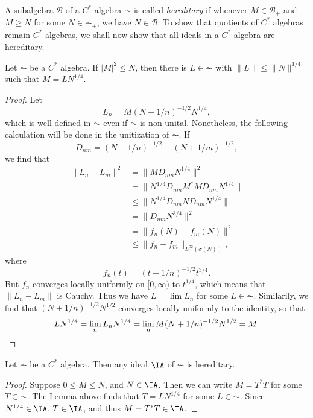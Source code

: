 A subalgebra $\mathcal{B}$ of a $C^*$ algebra $\AC$ is called \emph{hereditary} if whenever $M \in \mathcal{B}_+$ and $M \geq N$ for some $N \in \AC_+$, we have $N \in \mathcal{B}$. To show that quotients of $C^*$ algebras remain $C^*$ algebras, we shall now show that all ideals in a $C^*$ algebra are hereditary.

\begin{lemma}
    Let $\AC$ be a $C^*$ algebra. If $|M|^2 \leq N$, then there is $L \in \AC$ with $\| L \| \leq \| N \|^{1/4}$ such that $M = LN^{1/4}$.
\end{lemma}
\begin{proof}
    Let
    \[ L_n = M(N + 1/n)^{-1/2} N^{1/4}, \]
    which is well-defined in $\AC$ even if $\AC$ is non-unital. Nonetheless, the following calculation will be done in the unitization of $\AC$. If
    \[ D_{nm} = (N + 1/n)^{-1/2} - (N + 1/m)^{-1/2}, \]
    we find that
    \begin{align*}
        \| L_n - L_m \|^2 &= \| M D_{nm} N^{1/4} \|^2\\
        &= \| N^{1/4} D_{nm} M^* M D_{nm} N^{1/4} \|\\
        &\leq \| N^{1/4} D_{nm} N D_{nm} N^{1/4} \|\\
        &= \| D_{nm} N^{3/4} \|^2\\
        &= \| f_n(N) - f_m(N) \|^2\\
        &\leq \| f_n - f_m \|_{L^\infty(\sigma(N))},
    \end{align*}
    where
    \[ f_n(t) = (t + 1/n)^{-1/2} t^{3/4}. \]
    But $f_n$ converges locally uniformly on $[0,\infty)$ to $t^{1/4}$, which means that $\| L_n - L_m \|$ is Cauchy. Thus we have $L = \lim L_n$ for some $L \in \AC$. Similarily, we find that $(N + 1/n)^{-1/2} N^{1/2}$ converges locally uniformly to the identity, so that
    \[ LN^{1/4} = \lim_n L_n N^{1/4} = \lim_n M (N + 1/n)^{-1/2} N^{1/2} = M. \qedhere \]
\end{proof}

\begin{theorem}
    Let $\AC$ be a $C^*$ algebra. Then any ideal $\IA$ of $\AC$ is hereditary.
\end{theorem}
\begin{proof}
    Suppose $0 \leq M \leq N$, and $N \in \IA$. Then we can write $M = T^*T$ for some $T \in \AC$. The Lemma above finds that $T = LN^{1/4}$ for some $L \in \AC$. Since $N^{1/4} \in \IA$, $T \in \IA$, and thus $M = T^*T \in \IA$.
\end{proof}

